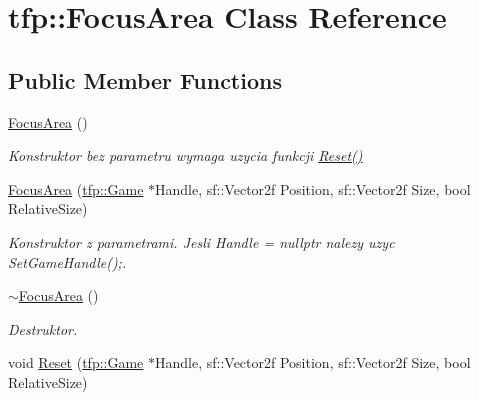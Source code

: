 \hypertarget{classtfp_1_1_focus_area}{}\section{tfp\+:\+:Focus\+Area Class Reference}
\label{classtfp_1_1_focus_area}
\subsection*{Public Member Functions}
\begin{DoxyCompactItemize}
\item 
\mbox{\label{classtfp_1_1_focus_area_af46f704ef1548e51e678e134f8f92ec5}} 
\mbox{\hyperlink{classtfp_1_1_focus_area_af46f704ef1548e51e678e134f8f92ec5}{Focus\+Area}} ()
\begin{DoxyCompactList}\small\item\em Konstruktor bez parametru wymaga uzycia funkcji \mbox{\hyperlink{classtfp_1_1_focus_area_a23c05868f070600b214c113e3705b4c9}{Reset()}} \end{DoxyCompactList}\item 
\mbox{\label{classtfp_1_1_focus_area_ad9989ba0ff51d9c07d7581b93714eb7f}} 
\mbox{\hyperlink{classtfp_1_1_focus_area_ad9989ba0ff51d9c07d7581b93714eb7f}{Focus\+Area}} (\mbox{\hyperlink{classtfp_1_1_game}{tfp\+::\+Game}} $\ast$Handle, sf\+::\+Vector2f Position, sf\+::\+Vector2f Size, bool Relative\+Size)
\begin{DoxyCompactList}\small\item\em Konstruktor z parametrami. Jesli Handle = nullptr nalezy uzyc Set\+Game\+Handle();. \end{DoxyCompactList}\item 
\mbox{\label{classtfp_1_1_focus_area_a80671cf059958c45fe92d9878bbc74a2}} 
\mbox{\hyperlink{classtfp_1_1_focus_area_a80671cf059958c45fe92d9878bbc74a2}{$\sim$\+Focus\+Area}} ()
\begin{DoxyCompactList}\small\item\em Destruktor. \end{DoxyCompactList}\item 
\mbox{\label{classtfp_1_1_focus_area_a23c05868f070600b214c113e3705b4c9}} 
void \mbox{\hyperlink{classtfp_1_1_focus_area_a23c05868f070600b214c113e3705b4c9}{Reset}} (\mbox{\hyperlink{classtfp_1_1_game}{tfp\+::\+Game}} $\ast$Handle, sf\+::\+Vector2f Position, sf\+::\+Vector2f Size, bool Relative\+Size)

\end{DoxyCompactItemize}
